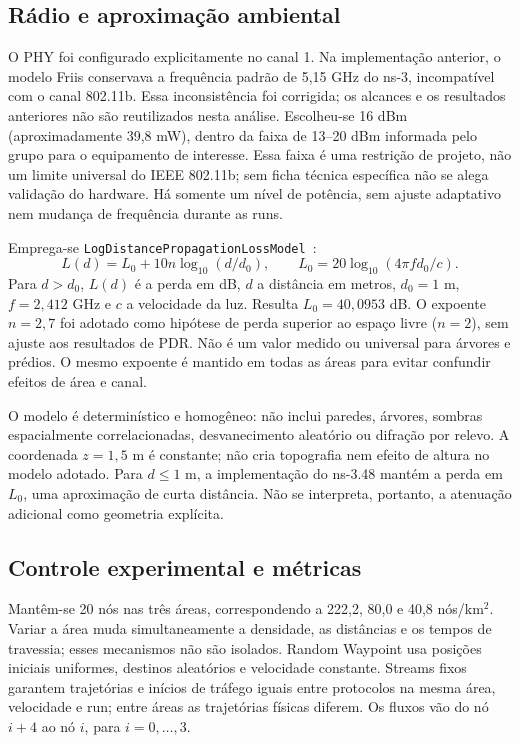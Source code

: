 \documentclass[12pt]{article}
\begin{document}
\subsection{Rádio e aproximação ambiental}
O PHY foi configurado explicitamente no canal 1. Na implementação anterior,
o modelo Friis conservava a frequência padrão de 5,15 GHz do ns-3, incompatível
com o canal 802.11b. Essa inconsistência foi corrigida; os alcances e os
resultados anteriores não são reutilizados nesta análise.
Escolheu-se 16 dBm (aproximadamente 39,8 mW), dentro da faixa de 13--20 dBm
informada pelo grupo para o equipamento de interesse. Essa faixa é uma
restrição de projeto, não um limite universal do IEEE 802.11b; sem ficha
técnica específica não se alega validação do hardware. Há somente um nível
de potência, sem ajuste adaptativo nem mudança de frequência durante as runs.

Emprega-se \texttt{LogDistancePropagationLossModel}~\cite{ns3propagation}:
\begin{equation}
L(d)=L_0+10n\log_{10}(d/d_0),\qquad
L_0=20\log_{10}(4\pi f d_0/c).
\end{equation}
Para $d>d_0$, $L(d)$ é a perda em dB, $d$ a distância em metros,
$d_0=1$ m, $f=2{,}412$ GHz e $c$ a velocidade da luz. Resulta
$L_0=40{,}0953$ dB. O expoente $n=2{,}7$ foi adotado como hipótese de perda
superior ao espaço livre ($n=2$), sem ajuste aos resultados de PDR.
Não é um valor medido ou universal para árvores e prédios. O mesmo expoente
é mantido em todas as áreas para evitar confundir efeitos de área e canal.

O modelo é determinístico e homogêneo: não inclui paredes, árvores, sombras
espacialmente correlacionadas, desvanecimento aleatório ou difração por
relevo. A coordenada $z=1{,}5$ m é constante; não cria topografia nem
efeito de altura no modelo adotado. Para $d\leq1$ m, a implementação do
ns-3.48 mantém a perda em $L_0$, uma aproximação de curta distância.
Não se interpreta, portanto, a atenuação adicional como geometria explícita.

\subsection{Controle experimental e métricas}
Mantêm-se 20 nós nas três áreas, correspondendo a 222,2, 80,0 e 40,8
nós/km$^2$. Variar a área muda simultaneamente a densidade, as distâncias e
os tempos de travessia; esses mecanismos não são isolados. Random Waypoint
usa posições iniciais uniformes, destinos aleatórios e velocidade constante.
Streams fixos garantem trajetórias e inícios de tráfego iguais entre
protocolos na mesma área, velocidade e run; entre áreas as trajetórias
físicas diferem. Os fluxos vão do nó $i+4$ ao nó $i$, para $i=0,\ldots,3$.
\end{document}
